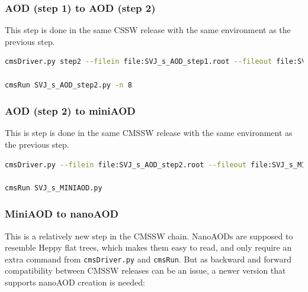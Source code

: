 \subsubsection{AOD (step 1) to AOD (step 2)}

This step is done in the same CSSW release with the same environment as the previous step.

\begin{lstlisting}[belowskip=-0.7cm, language=sh, numbers=none]
cmsDriver.py step2 --filein file:SVJ_s_AOD_step1.root --fileout file:SVJ_s_AOD_step2.root --mc --eventcontent AODSIM --runUnscheduled --datatier AODSIM --conditions 80X_mcRun2_asymptotic_2016_TrancheIV_v6 --step RAW2DIGI,RECO,EI --era Run2_2016 --python_filename SVJ_s_AOD_step2.py --no_exec --customise Configuration/DataProcessing/Utils.addMonitoring -n 250

cmsRun SVJ_s_AOD_step2.py -n 8
\end{lstlisting}


\subsubsection{AOD (step 2) to miniAOD}

This is step is done in the same CMSSW release with the same environment as the previous step.

\begin{lstlisting}[belowskip=-0.7cm, language=sh, numbers=none]
cmsDriver.py --filein file:SVJ_s_AOD_step2.root --fileout file:SVJ_s_MINIAOD.root --mc --eventcontent MINIAODSIM --runUnscheduled --datatier MINIAODSIM --conditions 80X_mcRun2_asymptotic_2016_TrancheIV_v6 --step PAT --era Run2_2016 --python_filename SVJ_s_MINIAOD.py --no_exec --customise Configuration/DataProcessing/Utils.addMonitoring -n 250

cmsRun SVJ_s_MINIAOD.py
\end{lstlisting}


\subsubsection{MiniAOD to nanoAOD}

This is a relatively new step in the CMSSW chain. NanoAODs are supposed to resemble Heppy flat trees, which makes them easy to read, and only require an extra command from \texttt{cmsDriver.py} and \texttt{cmsRun}. But as backward and forward compatibility between CMSSW releases can be an issue, a newer version that supports nanoAOD creation is needed:

